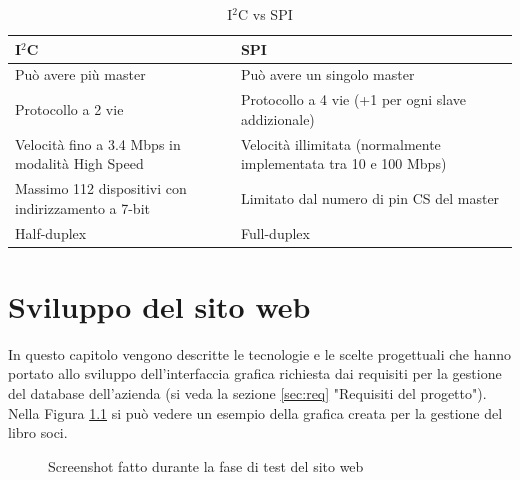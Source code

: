 \documentclass[12pt]{report}
\begin{document}
\begin{table}[h!]
	\centering
	\begin{tabularx}{\linewidth}{|L|L|}
		\hline 
		\textbf{I$^2$C} & \textbf{SPI} \\ 
		\hline
		Può avere più master & Può avere un singolo master \\ 
		\hline
		Protocollo a 2 vie & Protocollo a 4 vie (+1 per ogni slave addizionale) \\ 
		\hline
		Velocità fino a 3.4 Mbps in modalità High Speed &  Velocità illimitata (normalmente implementata tra 10 e 100 Mbps) \\ 
		\hline
		Massimo 112 dispositivi con indirizzamento a 7-bit & Limitato dal numero di pin CS del master \\ 
		\hline
		Half-duplex & Full-duplex \\ 
		\hline
	\end{tabularx}
	\caption{I$^2$C vs SPI\cite{i2c_vs_spi}}
	\label{tab:i2c_vs_spi}
\end{table}

\chapter{Sviluppo del sito web}
\label{cap3}
%

In questo capitolo vengono descritte le tecnologie e le scelte progettuali che hanno portato allo sviluppo dell'interfaccia grafica richiesta dai requisiti per la gestione del database dell'azienda (si veda la sezione \ref{sec:req} "Requisiti del progetto"). Nella Figura \ref{fig:esempio_libro_soci} si può vedere un esempio della grafica creata per la gestione del libro soci.

\begin{figure}
	\caption{Screenshot fatto durante la fase di test del sito web}
	\label{fig:esempio_libro_soci}
\end{figure}
\end{document}
